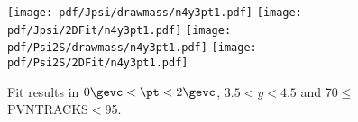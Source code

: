 \begin{figure}[H]
\begin{center}
\texttt{[image: pdf/Jpsi/drawmass/n4y3pt1.pdf]}
\texttt{[image: pdf/Jpsi/2DFit/n4y3pt1.pdf]}
\vspace*{-0.5cm}
\texttt{[image: pdf/Psi2S/drawmass/n4y3pt1.pdf]}
\texttt{[image: pdf/Psi2S/2DFit/n4y3pt1.pdf]}
\vspace*{-0.5cm}
\end{center}
\caption{Fit results in $0\gevc<\pt<2\gevc$, $3.5<y<4.5$ and 70$\leq$PVNTRACKS$<$95.}
\label{Fitn4y3pt1}
\end{figure}
